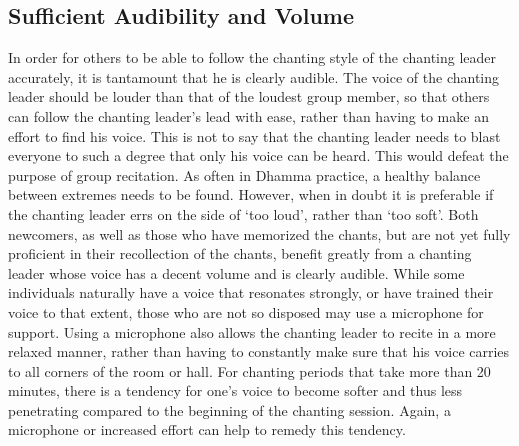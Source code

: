 \subsection*{Sufficient Audibility and Volume}
\begin{justify}
  In order for others to be able to follow the chanting style of the chanting leader accurately, it is tantamount that he is clearly audible. The voice of the chanting leader should be louder than that of the loudest group member, so that others can follow the chanting leader's lead with ease, rather than having to make an effort to find his voice. This is not to say that the chanting leader needs to blast everyone to such a degree that only his voice can be heard. This would defeat the purpose of group recitation. As often in Dhamma practice, a healthy balance between extremes needs to be found. However, when in doubt it is preferable if the chanting leader errs on the side of `too loud', rather than `too soft'. Both newcomers, as well as those who have memorized the chants, but are not yet fully proficient in their recollection of the chants, benefit greatly from a chanting leader whose voice has a decent volume and is clearly audible. While some individuals naturally have a voice that resonates strongly, or have trained their voice to that extent, those who are not so disposed may use a microphone for support. Using a microphone also allows the chanting leader to recite in a more relaxed manner, rather than having to constantly make sure that his voice carries to all corners of the room or hall. For chanting periods that take more than 20 minutes, there is a tendency for one's voice to become softer and thus less penetrating compared to the beginning of the chanting session. Again, a microphone or increased effort can help to remedy this tendency.
\end{justify}

